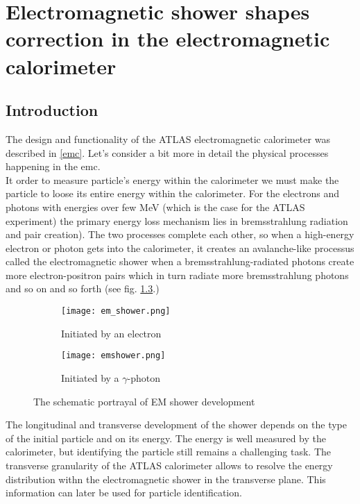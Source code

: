\chapter{Electromagnetic shower shapes correction in the electromagnetic calorimeter }
	\label{ch::sshapes}

  \section{Introduction}
  The design and functionality of the ATLAS electromagnetic calorimeter was described in \ref{emc}. Let's consider a bit more in detail the physical processes happening in the \gls{emc}. \\
  It order to measure particle's energy within the calorimeter we must make the particle to loose its entire energy within the calorimeter. For the electrons and photons with energies over few MeV (which is the case for the ATLAS experiment) the primary energy loss mechanism lies in bremsstrahlung radiation and pair creation). The two processes complete each other, so when a high-energy electron or photon gets into the calorimeter, it creates an avalanche-like processus called the electromagnetic shower when a bremsstrahlung-radiated photons create more electron-positron pairs which in turn radiate more bremsstrahlung photons and so on and so forth (see fig. \ref{fig::em_shower}.)\\
  	\begin{figure}[htbp]
  	\begin{subfigure}[t]{0.5\textwidth}
  		\texttt{[image: em\_shower.png]}
  		\caption[Started by an electron]{Initiated by an electron}
  		\label{fig::id}
  	\end{subfigure}
  	\hfill
  	\begin{subfigure}[t]{0.5\textwidth} 
  		\texttt{[image: emshower.png]}
  		\caption[Started by a $\gamma$-photon]{Initiated by a $\gamma$-photon}
  		\label{fig::pd}
  	\end{subfigure}
  	\caption{The schematic portrayal of EM shower development}
  	\label{fig::em_shower}
  \end{figure}
    The longitudinal and transverse development of the shower depends on the type of the initial particle and on its energy. The energy is well measured by the calorimeter, but identifying the particle still remains a challenging task. The transverse granularity of the ATLAS calorimeter allows to resolve the energy distribution withn the electromagnetic shower in the transverse plane. This information can later be used for particle identification.\\
